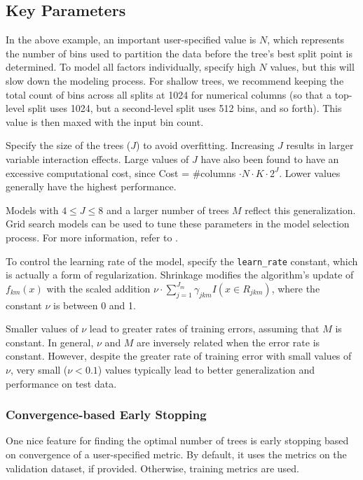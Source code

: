 \subsection{Key Parameters}
\label{ssec:Key parameters}
\raggedbottom
In the above example, an important user-specified value is $N$, which represents the number of bins used to partition the data before the tree's best split point is determined. To model all factors individually, specify high $N$ values, but this will slow down the modeling process. For shallow trees, we recommend keeping the total count of bins across all splits at 1024  for numerical columns (so that a top-level split uses 1024, but a second-level split uses 512 bins, and so forth). This value is then maxed with the input bin count.

Specify the size of the trees ($J$) to avoid overfitting. Increasing $J$ results in larger variable interaction effects. Large values of $J$ have also been found to have an excessive computational cost,
since Cost = \#columns $\cdot N \cdot K \cdot 2^{J}$. Lower values generally have the highest
performance. 

Models with $4 \leq J \leq 8$ and a larger number of trees $M$ reflect this generalization.
Grid search models can be used to tune these parameters in the model selection process. For more information, refer to {\textbf{}}. 

To control the learning rate of the model, specify the \texttt{learn\_rate} constant, which is actually a
form of regularization. Shrinkage modifies the algorithm's update of $f_{km}(x)$ with the scaled
addition $\nu \cdot \sum_{j=1}^{J_m} \gamma_{jkm} I(x \in R_{jkm})$, where the constant $\nu$ is between 0 and 1. 

Smaller values of $\nu$ lead to greater rates of training errors, assuming that $M$ is constant. In general, $\nu$ and $M$ are inversely related when the error rate is  constant. However, despite the greater rate of training error with small values of $\nu$, very small ($\nu < 0.1$) values typically lead to better generalization and performance on test data.

\subsubsection{Convergence-based Early Stopping}
One nice feature for finding the optimal number of trees is early stopping based on convergence of a user-specified metric. By default, it uses the metrics on the validation dataset, if provided. Otherwise, training metrics are used.

